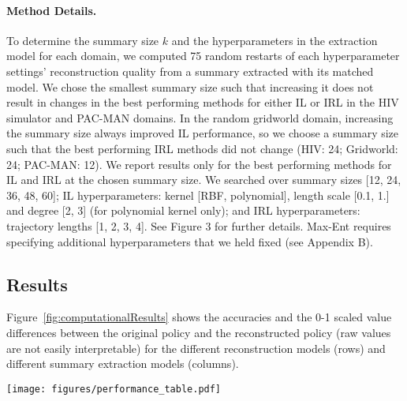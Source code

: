 \documentclass{article}
\begin{document}
\paragraph{Method Details.} To determine the summary size $k$ and the hyperparameters in the extraction model for each domain, we computed 75 random restarts of each hyperparameter settings' reconstruction quality from a summary extracted with its matched model. We chose the smallest summary size such that increasing it does not result in changes in the best performing methods for either IL or IRL in the HIV simulator and PAC-MAN domains. In the random gridworld domain, increasing the summary size always improved IL performance, so we choose a summary size such that the best performing IRL methods did not change (HIV: 24; Gridworld: 24; PAC-MAN: 12). We report results only for the best performing methods for IL and IRL at the chosen summary size. We searched over summary sizes [12, 24, 36, 48, 60]; IL hyperparameters: kernel [RBF, polynomial], length scale [0.1, 1.] and degree [2, 3] (for polynomial kernel only); and IRL hyperparameters: trajectory lengths [1, 2, 3, 4]. See \cite{lage2019policysummarization} Figure 3 for further details. Max-Ent requires specifying additional hyperparameters that we held fixed (see \cite{lage2019policysummarization} Appendix B).

\subsection{Results}

Figure~\ref{fig:computationalResults} shows the accuracies and the 0-1 scaled value differences between the original policy and the reconstructed policy (raw values are not easily interpretable) for the different reconstruction models (rows) and different summary extraction models (columns).

\begin{figure*}
\centering
\texttt{[image: figures/performance\_table.pdf]}
\caption{Accuracy (higher is better) and 0-1 scaled value differences (lower is better) averaged over 75 random restarts of every reconstruction model (rows in heatmaps) used for summary extraction with summaries extracted with each model (columns in heatmaps). IRL hyperparameter corresponds to trajectory length; IL hyperparameters indicate kernel, length scale, degree in that order. 
The comparatively high accuracy and low value differences for the reconstructions where the summarization model matches the reconstruction model, indicate that matching the summarization model to the reconstruction model is important for producing a high quality reconstruction.}
\label{fig:computationalResults}
\vspace{-0.2cm}
\end{figure*}
\end{document}
